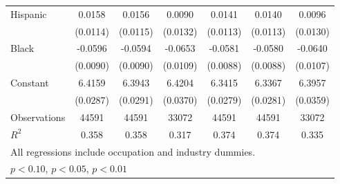 {\begin{longtable}{l*{6}{c}}
Hispanic            &      0.0158         &      0.0156         &      0.0090         &      0.0141         &      0.0140         &      0.0096         \\
                    &    (0.0114)         &    (0.0115)         &    (0.0132)         &    (0.0113)         &    (0.0113)         &    (0.0130)         \\
Black               &     -0.0596\sym{***}&     -0.0594\sym{***}&     -0.0653\sym{***}&     -0.0581\sym{***}&     -0.0580\sym{***}&     -0.0640\sym{***}\\
                    &    (0.0090)         &    (0.0090)         &    (0.0109)         &    (0.0088)         &    (0.0088)         &    (0.0107)         \\
Constant            &      6.4159\sym{***}&      6.3943\sym{***}&      6.4204\sym{***}&      6.3415\sym{***}&      6.3367\sym{***}&      6.3957\sym{***}\\
                    &    (0.0287)         &    (0.0291)         &    (0.0370)         &    (0.0279)         &    (0.0281)         &    (0.0359)         \\
\hline  
Observations        &       44591         &       44591         &       33072         &       44591         &       44591         &       33072         \\
\(R^{2}\)           &       0.358         &       0.358         &       0.317         &       0.374         &       0.374         &       0.335         \\
\hline  
\multicolumn{7}{l}{\footnotesize All regressions include occupation and industry dummies.}\\
\multicolumn{7}{l}{\footnotesize \sym{*} \(p<0.10\), \sym{**} \(p<0.05\), \sym{***} \(p<0.01\)}\\
\end{longtable}
}
